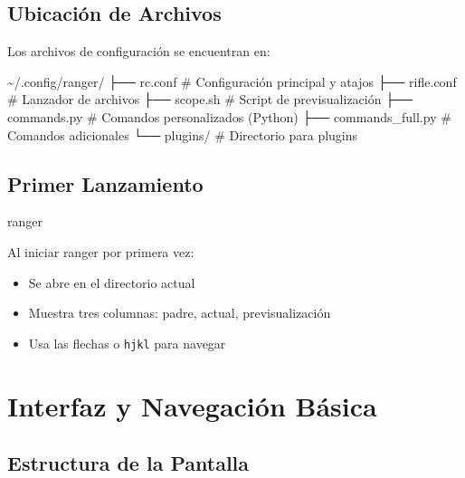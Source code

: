 \documentclass[
  doc,
  floatsintext,
  longtable,
  a4paper,
  nolmodern,
  notxfonts,
  notimes,
  12pt,
  colorlinks=true,linkcolor=blue,citecolor=blue,urlcolor=blue]{apa7}
\newenvironment{Shaded}{\begin{snugshade}}{\end{snugshade}}
\newcommand{\CommentTok}[1]{\textcolor[rgb]{0.37,0.37,0.37}{#1}}
\newcommand{\ExtensionTok}[1]{\textcolor[rgb]{0.00,0.23,0.31}{#1}}
\newcommand{\NormalTok}[1]{\textcolor[rgb]{0.00,0.23,0.31}{#1}}
\providecommand{\tightlist}{%
  \setlength{\itemsep}{0pt}\setlength{\parskip}{0pt}}
\begin{document}
\subsection{Ubicación de Archivos}\label{ubicaciuxf3n-de-archivos}

Los archivos de configuración se encuentran en:

\begin{Shaded}
\begin{Highlighting}[]
\ExtensionTok{\textasciitilde{}/.config/ranger/}
\ExtensionTok{├──}\NormalTok{ rc.conf           }\CommentTok{\# Configuración principal y atajos}
\ExtensionTok{├──}\NormalTok{ rifle.conf        }\CommentTok{\# Lanzador de archivos}
\ExtensionTok{├──}\NormalTok{ scope.sh          }\CommentTok{\# Script de previsualización}
\ExtensionTok{├──}\NormalTok{ commands.py       }\CommentTok{\# Comandos personalizados (Python)}
\ExtensionTok{├──}\NormalTok{ commands\_full.py  }\CommentTok{\# Comandos adicionales}
\ExtensionTok{└──}\NormalTok{ plugins/          }\CommentTok{\# Directorio para plugins}
\end{Highlighting}
\end{Shaded}

\subsection{Primer Lanzamiento}\label{primer-lanzamiento}

\begin{Shaded}
\begin{Highlighting}[]
\ExtensionTok{ranger}
\end{Highlighting}
\end{Shaded}

Al iniciar ranger por primera vez:

\begin{itemize}
\tightlist
\item
  Se abre en el directorio actual
\item
  Muestra tres columnas: padre, actual, previsualización
\item
  Usa las flechas o \texttt{hjkl} para navegar
\end{itemize}

\section{Interfaz y Navegación
Básica}\label{interfaz-y-navegaciuxf3n-buxe1sica}

\subsection{Estructura de la Pantalla}\label{estructura-de-la-pantalla}
\end{document}
